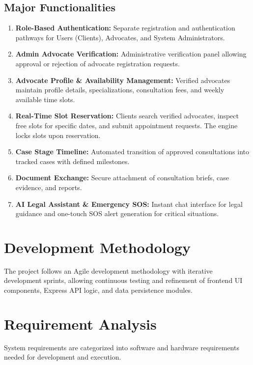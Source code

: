 \subsection{Major Functionalities}
\begin{enumerate}
    \item \textbf{Role-Based Authentication:} Separate registration and authentication pathways for Users (Clients), Advocates, and System Administrators.
    \item \textbf{Admin Advocate Verification:} Administrative verification panel allowing approval or rejection of advocate registration requests.
    \item \textbf{Advocate Profile \& Availability Management:} Verified advocates maintain profile details, specializations, consultation fees, and weekly available time slots.
    \item \textbf{Real-Time Slot Reservation:} Clients search verified advocates, inspect free slots for specific dates, and submit appointment requests. The engine locks slots upon reservation.
    \item \textbf{Case Stage Timeline:} Automated transition of approved consultations into tracked cases with defined milestones.
    \item \textbf{Document Exchange:} Secure attachment of consultation briefs, case evidence, and reports.
    \item \textbf{AI Legal Assistant \& Emergency SOS:} Instant chat interface for legal guidance and one-touch SOS alert generation for critical situations.
\end{enumerate}

\section{Development Methodology}
The project follows an Agile development methodology with iterative development sprints, allowing continuous testing and refinement of frontend UI components, Express API logic, and data persistence modules.

\section{Requirement Analysis}
System requirements are categorized into software and hardware requirements needed for development and execution.


